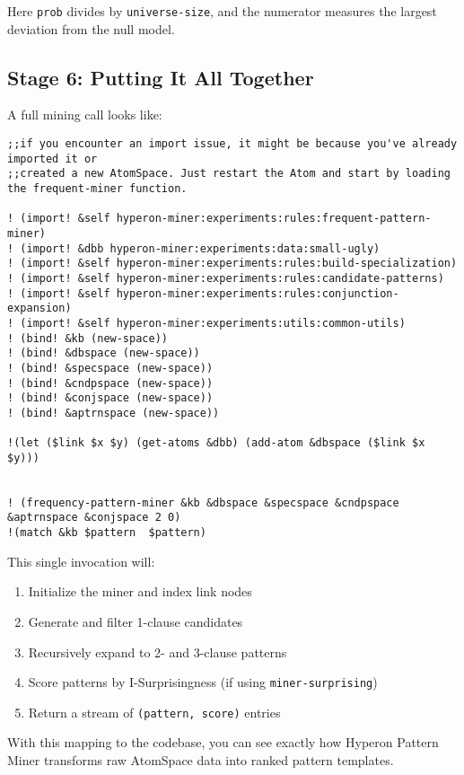 \documentclass{article}
\begin{document}
Here \texttt{prob} divides by \texttt{universe-size}, and the numerator measures the largest deviation from the null model.

\subsection{Stage 6: Putting It All Together}

A full mining call looks like:

\begin{verbatim}
;;if you encounter an import issue, it might be because you've already imported it or 
;;created a new AtomSpace. Just restart the Atom and start by loading the frequent-miner function.

! (import! &self hyperon-miner:experiments:rules:frequent-pattern-miner)
! (import! &dbb hyperon-miner:experiments:data:small-ugly)
! (import! &self hyperon-miner:experiments:rules:build-specialization)
! (import! &self hyperon-miner:experiments:rules:candidate-patterns)
! (import! &self hyperon-miner:experiments:rules:conjunction-expansion)
! (import! &self hyperon-miner:experiments:utils:common-utils)
! (bind! &kb (new-space))
! (bind! &dbspace (new-space))
! (bind! &specspace (new-space))
! (bind! &cndpspace (new-space))
! (bind! &conjspace (new-space))
! (bind! &aptrnspace (new-space))

!(let ($link $x $y) (get-atoms &dbb) (add-atom &dbspace ($link $x $y)))


! (frequency-pattern-miner &kb &dbspace &specspace &cndpspace &aptrnspace &conjspace 2 0)
!(match &kb $pattern  $pattern)
\end{verbatim}

This single invocation will:

\begin{enumerate}
  \item Initialize the miner and index link nodes
  \item Generate and filter 1-clause candidates
  \item Recursively expand to 2- and 3-clause patterns
  \item Score patterns by I-Surprisingness (if using \texttt{miner-surprising})
  \item Return a stream of \texttt{(pattern, score)} entries
\end{enumerate}

With this mapping to the codebase, you can see exactly how Hyperon Pattern Miner transforms raw AtomSpace data into ranked pattern templates.
\end{document}
